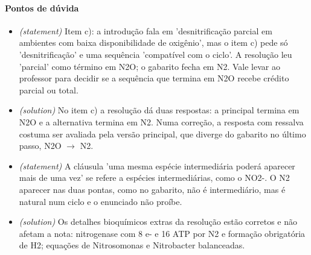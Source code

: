 \documentclass{article}%
\begin{document}
\paragraph{Pontos de dúvida}%
\begin{itemize}%
\item%
\textit{(statement)} Item c): a introdução fala em 'desnitrificação parcial em ambientes com baixa disponibilidade de oxigênio', mas o item c) pede só 'desnitrificação' e uma sequência 'compatível com o ciclo'. A resolução leu 'parcial' como término em N2O; o gabarito fecha em N2. Vale levar ao professor para decidir se a sequência que termina em N2O recebe crédito parcial ou total.%
\item%
\textit{(solution)} No item c) a resolução dá duas respostas: a principal termina em N2O e a alternativa termina em N2. Numa correção, a resposta com ressalva costuma ser avaliada pela versão principal, que diverge do gabarito no último passo, N2O $\to$ N2.%
\item%
\textit{(statement)} A cláusula 'uma mesma espécie intermediária poderá aparecer mais de uma vez' se refere a espécies intermediárias, como o NO2-. O N2 aparecer nas duas pontas, como no gabarito, não é intermediário, mas é natural num ciclo e o enunciado não proíbe.%
\item%
\textit{(solution)} Os detalhes bioquímicos extras da resolução estão corretos e não afetam a nota: nitrogenase com 8 e- e 16 ATP por N2 e formação obrigatória de H2; equações de Nitrosomonas e Nitrobacter balanceadas.%
\end{itemize}%
\end{document}
